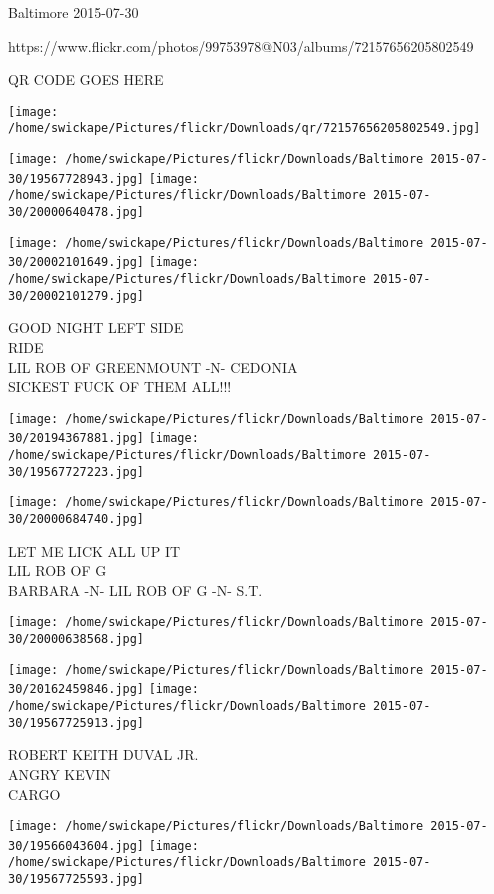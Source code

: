 \documentclass[10pt,letterpaper]{article}
\begin{document}
Baltimore 2015-07-30

https://www.flickr.com/photos/99753978@N03/albums/72157656205802549

QR CODE GOES HERE

\texttt{[image: /home/swickape/Pictures/flickr/Downloads/qr/72157656205802549.jpg]}
\pagebreak

\texttt{[image: /home/swickape/Pictures/flickr/Downloads/Baltimore 2015-07-30/19567728943.jpg]}
\texttt{[image: /home/swickape/Pictures/flickr/Downloads/Baltimore 2015-07-30/20000640478.jpg]}

\texttt{[image: /home/swickape/Pictures/flickr/Downloads/Baltimore 2015-07-30/20002101649.jpg]}
\texttt{[image: /home/swickape/Pictures/flickr/Downloads/Baltimore 2015-07-30/20002101279.jpg]}

GOOD NIGHT LEFT SIDE\\
RIDE\\
LIL ROB OF GREENMOUNT {-}N{-} CEDONIA\\
SICKEST FUCK OF THEM ALL!!!\\
\pagebreak

\texttt{[image: /home/swickape/Pictures/flickr/Downloads/Baltimore 2015-07-30/20194367881.jpg]}
\texttt{[image: /home/swickape/Pictures/flickr/Downloads/Baltimore 2015-07-30/19567727223.jpg]}

\texttt{[image: /home/swickape/Pictures/flickr/Downloads/Baltimore 2015-07-30/20000684740.jpg]}

LET ME LICK ALL UP IT\\
LIL ROB OF G\\
BARBARA {-}N{-} LIL ROB OF G {-}N{-} S.T.\\
\pagebreak

\texttt{[image: /home/swickape/Pictures/flickr/Downloads/Baltimore 2015-07-30/20000638568.jpg]}

\vspace{0.25in}
\texttt{[image: /home/swickape/Pictures/flickr/Downloads/Baltimore 2015-07-30/20162459846.jpg]}
\texttt{[image: /home/swickape/Pictures/flickr/Downloads/Baltimore 2015-07-30/19567725913.jpg]}

ROBERT KEITH DUVAL JR.\\
ANGRY KEVIN\\
CARGO\\
\pagebreak

\texttt{[image: /home/swickape/Pictures/flickr/Downloads/Baltimore 2015-07-30/19566043604.jpg]}
\texttt{[image: /home/swickape/Pictures/flickr/Downloads/Baltimore 2015-07-30/19567725593.jpg]}
\end{document}
